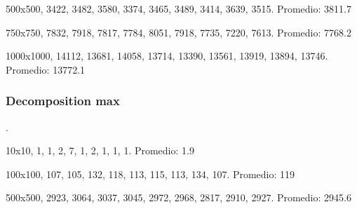 \documentclass[conference]{IEEEtran}
\begin{document}
500x500, 3422, 3482, 3580, 3374, 3465, 3489, 3414, 3639, 3515.\newline
Promedio: 3811.7
\newline

750x750, 7832, 7918, 7817, 7784, 8051, 7918, 7735, 7220, 7613.\newline
Promedio: 7768.2
\newline

1000x1000, 14112, 13681, 14058, 13714, 13390, 13561, 13919, 13894, 13746.\newline
Promedio: 13772.1\newline
{}



\subsubsection{Decomposition max}
.
\newline

10x10, 1, 1, 2, 7, 1, 2, 1, 1, 1.
\newline
Promedio: 1.9
\newline

100x100, 107, 105, 132, 118, 113, 115, 113, 134, 107.
\newline
Promedio: 119 
\newline

500x500, 2923, 3064, 3037, 3045, 2972, 2968, 2817, 2910, 2927.
\newline
Promedio: 2945.6
\newline
\end{document}
